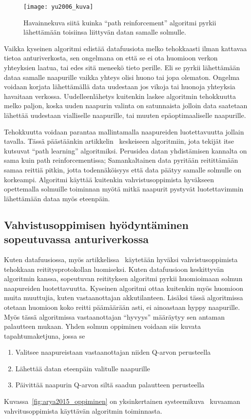 \begin{figure}[h]
  \centering
  \texttt{[image: yu2006\_kuva]}
  \caption{Havainnekuva siitä kuinka ``path reinforcement'' algoritmi pyrkii
    lähettämään toisiinsa liittyvän datan samalle solmulle.~\parencite{Yu2006}}
\label{fig:yu2006}
\end{figure}

Vaikka kyseinen algoritmi edistää datafuusiota melko tehokkaasti ilman kattavaa
tietoa anturiverkosta, sen ongelmana on että se ei ota huomioon verkon
yhteyksien laatua, tai edes sitä meneekö tieto perille. Eli se pyrkii
lähettämään dataa samalle naapurille vaikka yhteys olisi huono tai jopa
olematon. Ongelma voidaan korjata lähettämällä data uudestaan jos vikoja tai
huonoja yhteyksia havaitaan verkossa. Uudelleenlähetys kuitenkin laskee
algoritmin tehokkuutta melko paljon, koska uuden naapurin valinta on
satunnaista jolloin data saatetaan lähettää uudestaan vialliselle naapurille,
tai muuten epäoptimaaliselle naapurille.

Tehokkuutta voidaan parantaa mallintamalla naapureiden luotettavuutta jollain
tavalla. Tässä päästäänkin artikkelin~\cite{Yu2006} keskeiseen algoritmiin,
jota tekijät itse kutsuvat ``path learning'' algoritmiksi. Perusidea datan
yhdistämisen kannalta on sama kuin path reinforcementissa; Samankaltainen data
pyritään reitittämään samaa reittiä pitkin, jotta todennäköisyys että data
päätyy samalle solmulle on korkeampi. Algoritmi käyttää kuitenkin
vahvistusoppimista hyväkseen opettemalla solmuille toiminnan myötä mitkä
naapurit pystyvät luotettavimmin lähettämään dataa myös eteenpäin.

\subsection{Vahvistusoppimisen hyödyntäminen sopeutuvassa anturiverkossa}

Kuten datafuusiossa, myös artikkelissa~\cite{Arya2015} käytetään hyväksi
vahvistusoppimista tehokkaan reititysprotokollan luomiseksi. Kuten datafuusioon
keskittyvän algoritmin kanssa, sopeutuvan reitityksen algoritmi pyrkii
huomioimaan solmun naapureiden luotettavuutta. Kyseinen algoritmi ottaa
kuitenkin myös huomioon muita muuttujia, kuten vastaanottajan akkutilanteen.
Lisäksi tässä algoritmissa otetaan huomioon koko reitti päämäärään asti, ei
ainoastaan hyppy naapurille. Myös tässä algoritmissa vastaanottajan ``hyvyys''
määräytyy sen antaman palautteen mukaan. Yhden solmun oppiminen voidaan siis
kuvata tapahtumaketjuna, jossa se
\begin{enumerate}
  \item Valitsee naapureistaan vastaanottajan niiden Q-arvon perusteella
  \item Lähettää datan eteenpäin valitulle naapurille
  \item Päivittää naapurin Q-arvon siltä saadun palautteen perusteella
\end{enumerate}
Kuvassa~\ref{fig:arya2015_oppiminen} on yksinkertainen
systeemikuva~\cite{Arya2015} kuvaaman vahvitusoppimista käyttävän algoritmin
toiminnasta.

